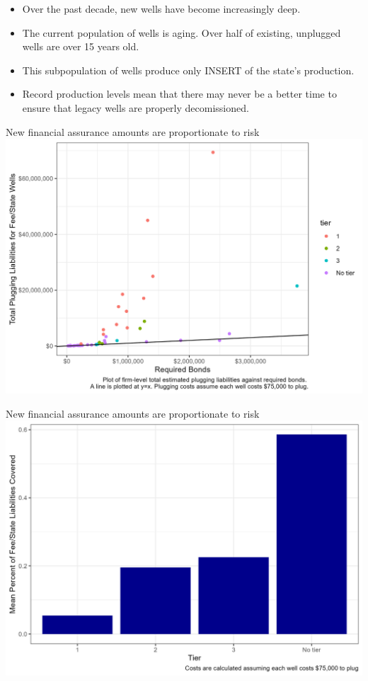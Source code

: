 \documentclass{beamer}
\newcommand{\nologo}{\setbeamertemplate{logo}{}}
\begin{document}
\begin{frame}{}
    \begin{itemize}
        \item Over the past decade, new wells have become increasingly deep.
        \item The current population of wells is aging. Over half of existing, unplugged wells are over 15 years old.
        \item This subpopulation of wells produce only INSERT of the state's production.
        \item Record production levels mean that there may never be a better time to ensure that legacy wells are properly decomissioned. 
    \end{itemize}
\end{frame}

{\nologo
\begin{frame}{New financial assurance amounts are proportionate to risk}
    \includegraphics[width=\textwidth]{Figures/FeeStateLiability2.jpg}
\end{frame}

\begin{frame}{New financial assurance amounts are proportionate to risk}
    \includegraphics[width=\textwidth]{Figures/FeeState_PCT_Bar.jpg}
\end{frame}
}
\end{document}
